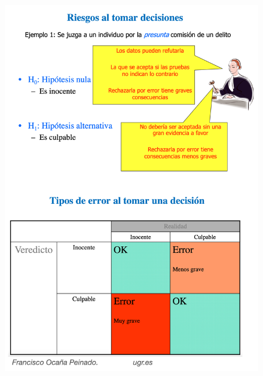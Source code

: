\begin{figure}[H]
	\centering
	\includegraphics[width=1\textwidth]{imagenes/imagenes06/T06IM02a.png}
	\end{figure}
	
